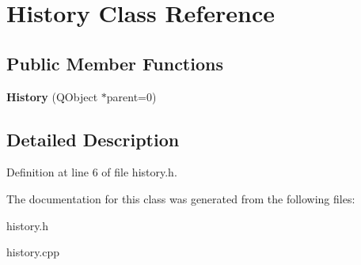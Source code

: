 \hypertarget{class_history}{
\section{History Class Reference}
\label{class_history}
}
\subsection*{Public Member Functions}
\begin{DoxyCompactItemize}
\item 
\hypertarget{class_history_a934f1dd8cd065f9685c36c5985460fa6}{
{\bfseries History} (QObject $\ast$parent=0)}
\label{class_history_a934f1dd8cd065f9685c36c5985460fa6}

\end{DoxyCompactItemize}


\subsection{Detailed Description}


Definition at line 6 of file history.h.



The documentation for this class was generated from the following files:\begin{DoxyCompactItemize}
\item 
history.h\item 
history.cpp\end{DoxyCompactItemize}

